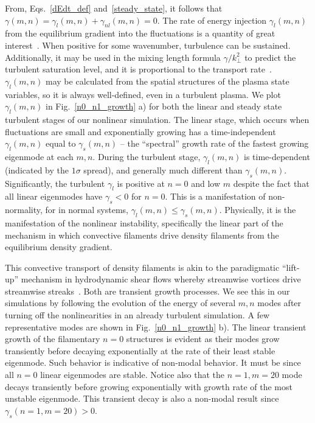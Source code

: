 \documentclass[letter,scriptaddress,twocolumn, prl,showkeys]{revtex4}
\begin{document}
From, Eqs.~\ref{dEdt_def} and~\ref{steady_state}, it follows that $ \gamma(m,n) = \gamma_l(m,n) + \gamma_{nl}(m,n) = 0$.
The rate of energy injection $\gamma_l(m,n)$ from the equilibrium gradient into the fluctuations is a quantity of great interest~\cite{friedman2012b,terry2006b}. 
When positive for some wavenumber, turbulence can be sustained. Additionally, it may be used in the mixing length formula $\gamma/k_\perp^2$ to predict the turbulent saturation level, 
and it is proportional to the transport rate~\cite{terry2006b}. 
$\gamma_l(m,n)$ may be calculated from the spatial structures of the plasma state variables, so it is always well-defined, even in a turbulent plasma. We plot
$\gamma_l(m,n)$ in Fig.~\ref{n0_n1_growth} a) for both the linear and steady state turbulent stages of our nonlinear simulation. The linear stage, which occurs when fluctuations
are small and exponentially growing has a time-independent $\gamma_l(m,n)$ equal to $\gamma_s(m,n)$ -- the ``spectral'' growth rate of the fastest growing eigenmode at each $m,n$.
During the turbulent stage, $\gamma_l(m,n)$ is time-dependent (indicated by the $1 \sigma$ spread), and generally much different than $\gamma_s(m,n)$. Significantly,
the turbulent $\gamma_l$ is positive at $n=0$ and low $m$ despite the fact that all linear eigenmodes have $\gamma_s < 0$ for $n=0$. This is a manifestation
of non-normality, for in normal systems, $\gamma_l(m,n) \le \gamma_s(m,n)$. Physically, it is the manifestation of the nonlinear
instability, specifically the linear part of the mechanism in which convective filaments drive density filaments from the equilibrium density gradient.

This convective transport of density filaments is akin to the paradigmatic ``lift-up'' mechanism in hydrodynamic shear flows whereby streamwise vortices drive streamwise 
streaks~\cite{trefethen1993,krommes1999}.
Both are transient growth processes. We see this in our simulations by following the evolution of the energy of several $m,n$ modes after turning off the nonlinearities in an already
turbulent simulation. A few representative modes are shown in Fig.~\ref{n0_n1_growth} b). The linear transient growth of the filamentary $n=0$ structures is evident as their modes 
grow transiently before decaying exponentially at the rate of their least stable eigenmode. Such behavior is indicative of non-modal behavior. It must be since 
all $n=0$ linear eigenmodes are stable. Notice also that the $n=1,m=20$ mode decays transiently before growing exponentially with growth rate of the most unstable eigenmode. This transient
decay is also a non-modal result since $\gamma_s(n=1,m=20) > 0$.
\end{document}
